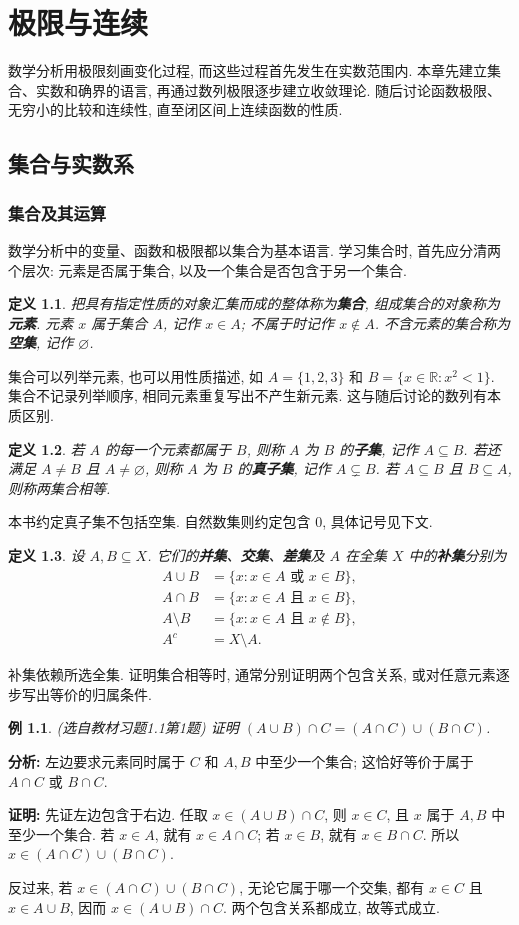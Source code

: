 \documentclass[UTF8,openany]{ctexbook}
\theoremstyle{chinesetextbook}
\newtheorem{definition}{定义}[section]
\newtheorem{example}{例}[section]
\newenvironment{cnproof}{\par\indent\textbf{证明:} \ignorespaces}{\par}
\begin{document}
\tableofcontents
\clearpage
\chapter{极限与连续}
数学分析用极限刻画变化过程, 而这些过程首先发生在实数范围内. 本章先建立集合、实数和确界的语言, 再通过数列极限逐步建立收敛理论. 随后讨论函数极限、无穷小的比较和连续性, 直至闭区间上连续函数的性质.
\section{集合与实数系}
\subsection{集合及其运算}
数学分析中的变量、函数和极限都以集合为基本语言. 学习集合时, 首先应分清两个层次: 元素是否属于集合, 以及一个集合是否包含于另一个集合.
\begin{definition}
把具有指定性质的对象汇集而成的整体称为\textbf{集合}, 组成集合的对象称为\textbf{元素}. 元素 $x$ 属于集合 $A$, 记作 $x\in A$; 不属于时记作 $x\notin A$. 不含元素的集合称为\textbf{空集}, 记作 $\varnothing$.
\end{definition}
集合可以列举元素, 也可以用性质描述, 如 $A=\{1,2,3\}$ 和 $B=\{x\in\mathbb R:x^2<1\}$. 集合不记录列举顺序, 相同元素重复写出不产生新元素. 这与随后讨论的数列有本质区别.
\begin{definition}
若 $A$ 的每一个元素都属于 $B$, 则称 $A$ 为 $B$ 的\textbf{子集}, 记作 $A\subseteq B$. 若还满足 $A\ne B$ 且 $A\ne\varnothing$, 则称 $A$ 为 $B$ 的\textbf{真子集}, 记作 $A\subsetneq B$. 若 $A\subseteq B$ 且 $B\subseteq A$, 则称两集合相等.
\end{definition}
本书约定真子集不包括空集. 自然数集则约定包含 $0$, 具体记号见下文.
\begin{definition}
设 $A,B\subseteq X$. 它们的\textbf{并集}、\textbf{交集}、\textbf{差集}及 $A$ 在全集 $X$ 中的\textbf{补集}分别为
\[
\begin{aligned}
A\cup B&=\{x:x\in A\text{ 或 }x\in B\},\\
A\cap B&=\{x:x\in A\text{ 且 }x\in B\},\\
A\setminus B&=\{x:x\in A\text{ 且 }x\notin B\},\\
A^c&=X\setminus A.
\end{aligned}
\]
\end{definition}
补集依赖所选全集. 证明集合相等时, 通常分别证明两个包含关系, 或对任意元素逐步写出等价的归属条件.
\begin{example}
(选自教材习题1.1第1题) 证明 $(A\cup B)\cap C=(A\cap C)\cup(B\cap C)$.
\end{example}
\par\indent\textbf{分析:} 左边要求元素同时属于 $C$ 和 $A,B$ 中至少一个集合; 这恰好等价于属于 $A\cap C$ 或 $B\cap C$.
\begin{cnproof}
先证左边包含于右边. 任取 $x\in(A\cup B)\cap C$, 则 $x\in C$, 且 $x$ 属于 $A,B$ 中至少一个集合. 若 $x\in A$, 就有 $x\in A\cap C$; 若 $x\in B$, 就有 $x\in B\cap C$. 所以 $x\in(A\cap C)\cup(B\cap C)$.

反过来, 若 $x\in(A\cap C)\cup(B\cap C)$, 无论它属于哪一个交集, 都有 $x\in C$ 且 $x\in A\cup B$, 因而 $x\in(A\cup B)\cap C$. 两个包含关系都成立, 故等式成立.
\end{cnproof}
\end{document}
